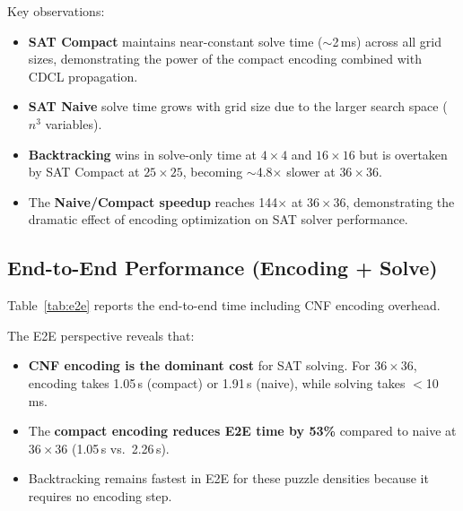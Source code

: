 \documentclass[12pt]{article}
\begin{document}
Key observations:
\begin{itemize}
    \item \textbf{SAT Compact} maintains near-constant solve time ($\sim$2\,ms) across all grid sizes, demonstrating the power of the compact encoding combined with CDCL propagation.
    \item \textbf{SAT Naive} solve time grows with grid size due to the larger search space ($n^3$ variables).
    \item \textbf{Backtracking} wins in solve-only time at $4\times4$ and $16\times16$ but is overtaken by SAT Compact at $25\times25$, becoming $\sim$4.8$\times$ slower at $36\times36$.
    \item The \textbf{Naive/Compact speedup} reaches 144$\times$ at $36\times36$, demonstrating the dramatic effect of encoding optimization on SAT solver performance.
\end{itemize}


\subsection{End-to-End Performance (Encoding + Solve)}

Table~\ref{tab:e2e} reports the end-to-end time including CNF encoding overhead.

\begin{table}[htbp]
\centering
\caption{End-to-end performance: encoding + solve time.}
\label{tab:e2e}
\end{table}

The E2E perspective reveals that:
\begin{itemize}
    \item \textbf{CNF encoding is the dominant cost} for SAT solving. For $36\times36$, encoding takes 1.05\,s (compact) or 1.91\,s (naive), while solving takes $<$10\,ms.
    \item The \textbf{compact encoding reduces E2E time by 53\%} compared to naive at $36\times36$ (1.05\,s vs.\ 2.26\,s).
    \item Backtracking remains fastest in E2E for these puzzle densities because it requires no encoding step.
\end{itemize}
\end{document}
